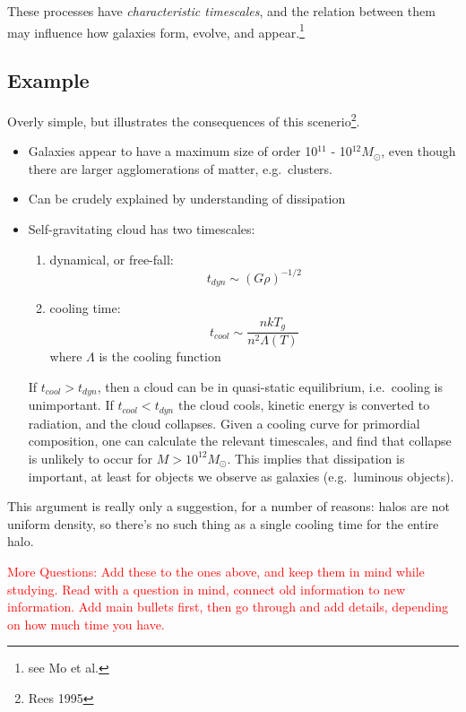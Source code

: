 \documentclass{article}
\begin{document}
These processes have \emph{characteristic timescales}, and the relation between
them may influence how galaxies form, evolve, and appear.\footnote{
see Mo et al.}

\subsection{Example}
Overly simple, but illustrates the consequences of this scenerio\footnote{
Rees 1995}.
\begin{itemize}
    \item Galaxies appear to have a maximum size of order
        10$^{11}$ - 10$^{12} M_{\odot}$, even though there are larger
        agglomerations of matter, e.g.\ clusters.
    \item Can be crudely explained by understanding of dissipation
    \item Self-gravitating cloud has two timescales:
        \begin{enumerate}
            \item dynamical, or free-fall:
                \[
                    t_{dyn} \sim (G\rho)^{-1/2}
                \]
            \item cooling time:
                \[
                    t_{cool} \sim \frac{nkT_{g}}{n^{2}\Lambda(T)}
                \]
                where $\Lambda$ is the cooling function
        \end{enumerate}
        If $t_{cool} > t_{dyn}$, then a cloud can be in quasi-static
        equilibrium, i.e.\ cooling is unimportant. If $t_{cool} < t_{dyn}$
        the cloud cools, kinetic energy is converted to radiation, and
        the cloud collapses. Given a cooling curve for primordial
        composition, one can calculate the relevant timescales, and find
        that collapse is unlikely to occur for $M>10^{12}M_{\odot}$.
        This implies that dissipation is important, at least for
        objects we observe as galaxies (e.g.\ luminous objects).
\end{itemize}

This argument is really only a suggestion, for a number of reasons:
halos are not uniform density, so there's no such thing as a single
cooling time for the entire halo.

\textcolor{red}{More Questions: Add these to the ones above, and keep them in mind
while studying. Read with a question in mind, connect old
information to new information. Add main bullets first, then go
through and add details, depending on how much time you have.}
\end{document}
